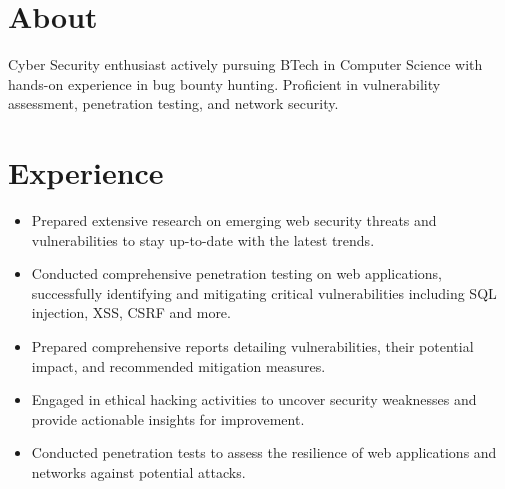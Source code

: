 \documentclass[]{roshan-resume}
\begin{document}
\begin{minipage}[t]{0.33\textwidth}
		
		
	\end{minipage} 
	\hfill
	\begin{minipage}[t]{0.66\textwidth} 
		
		\section{About}
		Cyber Security enthusiast actively pursuing BTech in Computer Science with hands-on experience in bug bounty hunting. Proficient in vulnerability assessment, penetration testing, and network security. 
		
		
		\section{Experience}
		\begin{itemize}
			\item Prepared extensive research on emerging web security threats and vulnerabilities to stay up-to-date with the latest trends. \\
			\item Conducted comprehensive penetration testing on web applications, successfully identifying and mitigating critical vulnerabilities including SQL injection, XSS, CSRF and more.
			\item Prepared comprehensive reports detailing
			vulnerabilities, their potential impact, and
			recommended mitigation measures. \\
			\item Engaged in ethical hacking activities to uncover
			security weaknesses and provide actionable insights for
			improvement.\\
			\item Conducted penetration tests to assess the resilience of
			web applications and networks against potential
			attacks.\\
		\end{itemize}
		

\end{minipage}
\end{document}
